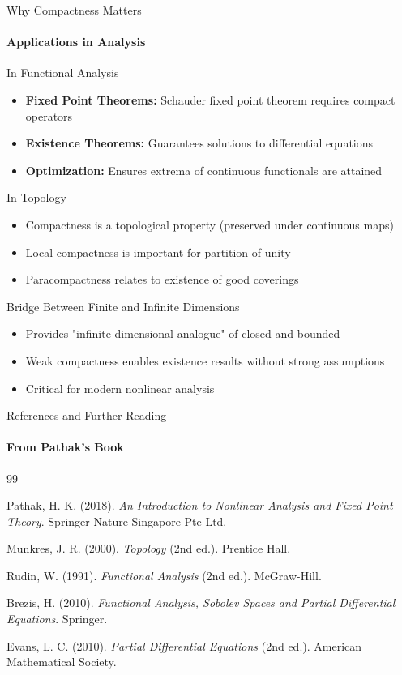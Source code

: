 \documentclass[aspectratio=169,10pt]{beamer}
\theoremstyle{definition}
\begin{document}
\begin{frame}{Why Compactness Matters}
\framesubtitle{Applications in Analysis}

\begin{block}{In Functional Analysis}
\begin{itemize}
    \item \textbf{Fixed Point Theorems:} Schauder fixed point theorem requires compact operators
    \item \textbf{Existence Theorems:} Guarantees solutions to differential equations
    \item \textbf{Optimization:} Ensures extrema of continuous functionals are attained
\end{itemize}
\end{block}

\begin{block}{In Topology}
\begin{itemize}
    \item Compactness is a topological property (preserved under continuous maps)
    \item Local compactness is important for partition of unity
    \item Paracompactness relates to existence of good coverings
\end{itemize}
\end{block}

\begin{block}{Bridge Between Finite and Infinite Dimensions}
\begin{itemize}
    \item Provides "infinite-dimensional analogue" of closed and bounded
    \item Weak compactness enables existence results without strong assumptions
    \item Critical for modern nonlinear analysis
\end{itemize}
\end{block}
\end{frame}

\begin{frame}[allowframebreaks]{References and Further Reading}
\framesubtitle{From Pathak's Book}

\begin{thebibliography}{99}

Pathak, H. K. (2018).
\emph{An Introduction to Nonlinear Analysis and Fixed Point Theory}.
Springer Nature Singapore Pte Ltd.

Munkres, J. R. (2000).
\emph{Topology} (2nd ed.).
Prentice Hall.

Rudin, W. (1991).
\emph{Functional Analysis} (2nd ed.).
McGraw-Hill.

Brezis, H. (2010).
\emph{Functional Analysis, Sobolev Spaces and Partial Differential Equations}.
Springer.

Evans, L. C. (2010).
\emph{Partial Differential Equations} (2nd ed.).
American Mathematical Society.

\end{thebibliography}

\end{frame}
\end{document}
